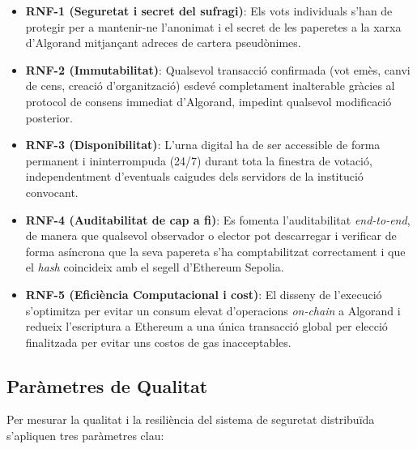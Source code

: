 \begin{itemize}
    \item \textbf{RNF-1 (Seguretat i secret del sufragi)}: Els vots individuals s'han de protegir per a mantenir-ne
    l'anonimat i el secret de les paperetes a la xarxa d'Algorand mitjançant adreces de cartera pseudònimes.

    \item \textbf{RNF-2 (Immutabilitat)}: Qualsevol transacció confirmada (vot emès, canvi de cens, creació
    d'organització) esdevé completament inalterable gràcies al protocol de consens immediat d'Algorand, impedint
    qualsevol modificació posterior.

    \item \textbf{RNF-3 (Disponibilitat)}: L'urna digital ha de ser accessible de forma permanent i ininterrompuda
    (24/7) durant tota la finestra de votació, independentment d'eventuals caigudes dels servidors de la institució
    convocant.

    \item \textbf{RNF-4 (Auditabilitat de cap a fi)}: Es fomenta l'auditabilitat \textit{end-to-end}, de manera que
    qualsevol observador o elector pot descarregar i verificar de forma asíncrona que la seva papereta s'ha
    comptabilitzat correctament i que el \textit{hash} coincideix amb el segell d'Ethereum Sepolia.

    \item \textbf{RNF-5 (Eficiència Computacional i cost)}: El disseny de l'execució s'optimitza per evitar un consum
    elevat d'operacions \textit{on-chain} a Algorand i redueix l'escriptura a Ethereum a una única transacció global per
    elecció finalitzada per evitar uns costos de gas inacceptables.
\end{itemize}

\subsection{Paràmetres de Qualitat}
\label{subsec:parametres-qualitat}

Per mesurar la qualitat i la resiliència del sistema de seguretat distribuïda s'apliquen tres paràmetres clau:

